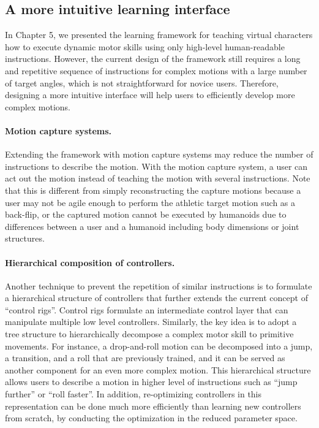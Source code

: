 \subsection{A more intuitive learning interface}

In Chapter 5, we presented the learning framework for teaching
virtual characters how to execute dynamic motor skills using only high-level
human-readable instructions. 
However, the current design of the framework still requires a long and
repetitive sequence of instructions for complex motions with a large 
number of target angles, which is not straightforward for novice users. 
Therefore, designing a more intuitive interface will help users to 
efficiently develop more complex motions.

\paragraph{Motion capture systems.}
Extending the framework with motion capture systems may reduce the number of
instructions to describe the motion.
With the motion capture system, a user can act out the motion instead of
teaching the motion with several instructions.
Note that this is different from simply reconstructing the capture motions
because a user may not be agile enough to perform the athletic target motion
such as a back-flip, 
or the captured motion cannot be executed by humanoids due to differences
between a user and a humanoid including body dimensions or joint structures.

\paragraph{Hierarchical composition of controllers.}
Another technique to prevent the repetition of similar instructions is to
formulate a hierarchical structure of controllers that further extends the
current concept of ``control rigs''.
Control rigs formulate an intermediate control layer that can manipulate
multiple low level controllers. 
Similarly, the key idea is to adopt a tree structure to hierarchically
decompose a complex motor skill to primitive movements. 
For instance, a drop-and-roll motion can be decomposed into a jump, a
transition, and a roll that are previously trained, and
it can be served as another component for an even more complex motion.
This hierarchical structure allows users to describe a motion in higher level
of instructions such as ``jump further'' or ``roll faster''.
In addition, re-optimizing controllers in this representation can be done much
more efficiently than learning new controllers from scratch, by conducting the
optimization in the reduced parameter space.


